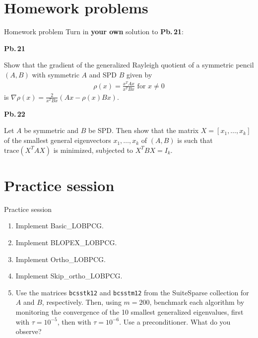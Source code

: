 \documentclass[t,usepdftitle=false]{beamer}
\begin{document}
\section{Homework problems}
\begin{frame}{Homework problem}\vspace{.1cm}
Turn in \textbf{your own} solution to \textbf{Pb.$\,$21}:\vspace{.15cm}\\
\begin{minipage}[t]{0.1\textwidth}
\textbf{Pb.$\,$21}
\end{minipage}
\begin{minipage}[t]{0.89\textwidth}
Show that the gradient of the generalized Rayleigh quotient of a symmetric pencil $(A,B)$ with symmetric $A$ and SPD $B$ given by
\begin{align*}
\rho(x)=\frac{x^TAx}{x^TBx}\text{ for }x\neq 0
\end{align*}
is $\nabla\rho(x)=\frac{2}{x^TBx}(Ax-\rho(x)Bx)$.
\end{minipage}\vspace{.15cm}

\begin{minipage}[t]{0.1\textwidth}
\textbf{Pb.$\,$22}
\end{minipage}
\begin{minipage}[t]{0.89\textwidth}
Let $A$ be symmetric and $B$ be SPD.
Then show that the matrix $X=[x_1,\dots,x_k]$ of the smallest general eigenvectors $x_1,\dots,x_k$ of $(A,B)$ is such that $\text{trace}(X^TAX)$ is minimized, subjected to $X^TBX=I_k$.
\end{minipage}
\end{frame}

\section{Practice session}
\begin{frame}[fragile]{Practice session}
\begin{enumerate}
\item Implement Basic\_LOBPCG.
\item Implement BLOPEX\_LOBPCG.
\item Implement Ortho\_LOBPCG.
\item Implement Skip\_ortho\_LOBPCG.
\item Use the matrices \texttt{bcsstk12} and \texttt{bcsstm12} from the SuiteSparse collection for $A$ and $B$, respectively.
Then, using $m=200$, benchmark each algorithm by monitoring the convergence of the 10 smallest generalized eigenvalues, first with $\tau=10^{-5}$, then with $\tau=10^{-6}$.
Use a preconditioner.
What do you observe?
\end{enumerate}
\end{frame}
\end{document}
